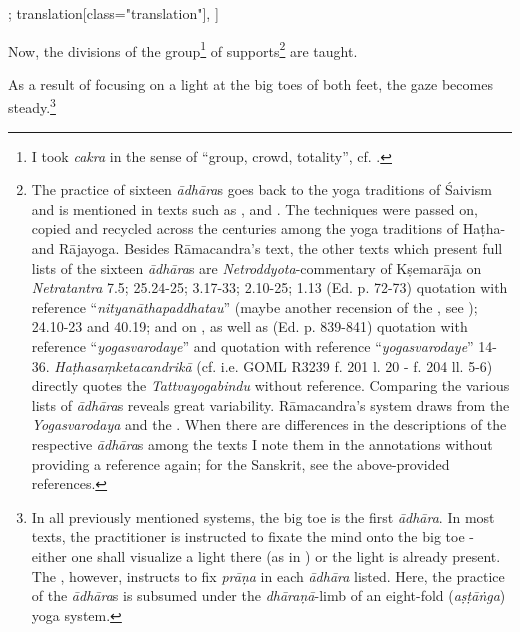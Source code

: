 \begin{alignment}[
  texts=edition[class="edition"];
  translation[class="translation"],
  ]
\begin{translation}
\begin{tlate}[p30_01]
      Now, the divisions of the group\footnote{I took \textit{cakra} in the sense of ``group, crowd, totality'', cf. \citeauthor[1958 (Vol. 2): 209]{petersburger}.} of supports\footnote{The practice of sixteen \textit{ādhāra}s goes back to the yoga traditions of Śaivism and is mentioned in texts such as ,  and . The techniques were passed on, copied and recycled across the centuries among the yoga traditions of Haṭha- and Rājayoga. Besides Rāmacandra's text, the other texts which present full lists of the sixteen \textit{ādhāra}s are \textit{Netroddyota}-commentary of Kṣemarāja on \textit{Netratantra} 7.5;  25.24-25;  3.17-33;  2.10-25;  1.13 (Ed. p. 72-73) quotation with reference ``\textit{nityanāthapaddhatau}'' (maybe another recension of the , see \citeauthor[2023: 149]{powell2023});  24.10-23 and 40.19; and  on , as well as  (Ed. p. 839-841) quotation with reference ``\textit{yogasvarodaye}'' and  quotation with reference ``\textit{yogasvarodaye}'' 14-36. \textit{Haṭhasaṃketacandrikā} (cf. i.e. GOML R3239 f. 201 l. 20 - f. 204 ll. 5-6) directly quotes the \textit{Tattvayogabindu} without reference. Comparing the various lists of \textit{ādhāra}s reveals great variability. Rāmacandra's system draws from the \textit{Yogasvarodaya} and the . When there are differences in the descriptions of the respective \textit{ādhāra}s among the texts I note them in the annotations without providing a reference again; for the Sanskrit, see the above-provided references.} are taught.%
      
     As a result of focusing on a light at the big toes of both feet, the gaze becomes steady.\footnote{In all previously mentioned systems, the big toe is the first \textit{ādhāra}. In most texts, the practitioner is instructed to fixate the mind onto the big toe - either one shall visualize a light there (as in ) or the light is already present. The , however, instructs to fix \textit{prāṇa} in each \textit{ādhāra} listed. Here, the practice of the \textit{ādhāra}s is subsumed under the \textit{dhāraṇā}-limb of an eight-fold (\textit{aṣṭāṅga}) yoga system.}
      

\end{tlate}
\end{translation}
\end{alignment}
